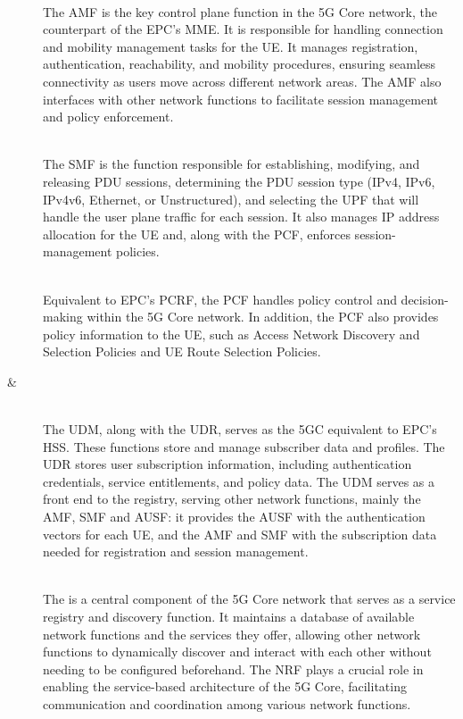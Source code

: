 \begin{description}
\item[{\normalfont{}}]~\\
The \gls{AMF} is the key control plane function in the 5G Core network, the counterpart of the \gls{EPC}'s  \gls{MME}. It is responsible for handling connection and mobility management tasks for the \gls{UE}. It manages registration, authentication, reachability, and mobility procedures, ensuring seamless connectivity as users move across different network areas. The \gls{AMF} also interfaces with other network functions to facilitate session management and policy enforcement.

\item[{\normalfont{}}]~\\
The \gls{SMF} is the function responsible for establishing, modifying, and releasing \gls{PDU} sessions, determining the \gls{PDU} session type (IPv4, IPv6, IPv4v6, Ethernet, or Unstructured), and selecting the \gls{UPF} that will handle the user plane traffic for each session. It also manages IP address allocation for the \gls{UE} and, along with the \gls{PCF}, enforces session-management policies.

\item[{\normalfont{}}]~\\
Equivalent to \gls{EPC}'s \gls{PCRF}, the \gls{PCF} handles policy control and decision-making within the 5G Core network. In addition, the \gls{PCF} also provides policy information to the \gls{UE}, such as Access Network Discovery and Selection Policies and \gls{UE} Route Selection Policies.

\item[{\normalfont{} \& }]~\\
The \gls{UDM}, along with the \gls{UDR}, serves as the \gls{5GC} equivalent to \gls{EPC}'s \gls{HSS}. These functions store and manage subscriber data and profiles. The \gls{UDR} stores user subscription information, including authentication credentials, service entitlements, and policy data. The \gls{UDM} serves as a front end to the registry, serving other network functions, mainly the \gls{AMF}, \gls{SMF} and \gls{AUSF}: it provides the \gls{AUSF} with the authentication vectors for each \gls{UE}, and the \gls{AMF} and \gls{SMF} with the subscription data needed for registration and session management.

\item[{\normalfont{}}]~\\
The  is a central component of the 5G Core network that serves as a service registry and discovery function. It maintains a database of available network functions and the services they offer, allowing other network functions to dynamically discover and interact with each other without needing to be configured beforehand. The \gls{NRF} plays a crucial role in enabling the service-based architecture of the 5G Core, facilitating communication and coordination among various network functions.


\end{description}
